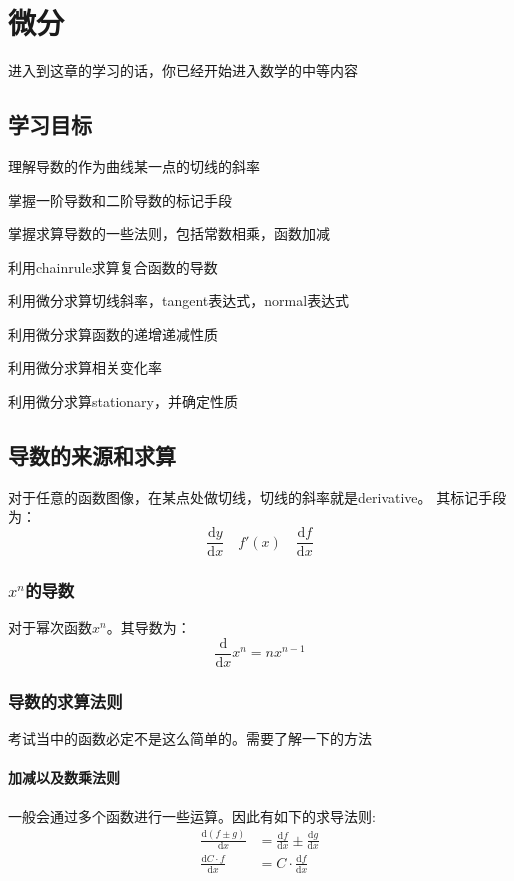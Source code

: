 \chapter{微分}
\label{ch:Differentiation}
进入到这章的学习的话，你已经开始进入数学的中等内容

\section*{学习目标}
\begin{todolist}
	\item 理解导数的作为曲线某一点的切线的斜率
	\item 掌握一阶导数和二阶导数的标记手段
	\item 掌握求算导数的一些法则，包括常数相乘，函数加减
	\item 利用\gls{chainrule}求算复合函数的导数
	\item 利用微分求算切线斜率，\gls{tangent}表达式，\gls{normal}表达式
	\item 利用微分求算函数的递增递减性质
	\item 利用微分求算相关变化率
	\item 利用微分求算\gls{stationary}，并确定性质
\end{todolist}
\clearpage

\section{导数的来源和求算}
\label{sec:Derivative}
对于任意的函数图像，在某点处做切线，切线的斜率就是\gls{derivative}。
其标记手段为：
\[
	\frac{\mathrm{d} y}{\mathrm{d} x} \quad f'(x) \quad \frac{\mathrm{d} f}{\mathrm{d} x}
\]

\subsection*{$x^n$的导数}
\label{subsec:Derivative for Power}
对于幂次函数$x^n$。其导数为：
\[
	\frac{\mathrm{d}}{\mathrm{d} x}x^n = nx^{n-1}
\]

\subsection*{导数的求算法则}
\label{subsec:Operation Rules with derivative}
考试当中的函数必定不是这么简单的。需要了解一下的方法
\subsubsection*{加减以及数乘法则}
一般会通过多个函数进行一些运算。因此有如下的求导法则:
\begin{align*}
	\frac{\mathrm{d} (f\pm g) }{\mathrm{d} x} &=\frac{\mathrm{d} f}{\mathrm{d} x} \pm \frac{\mathrm{d} g}{\mathrm{d} x}\\
	\frac{\mathrm{d} C\cdot f}{\mathrm{d} x} &=C \cdot \frac{\mathrm{d} f}{\mathrm{d} x}
\end{align*}

